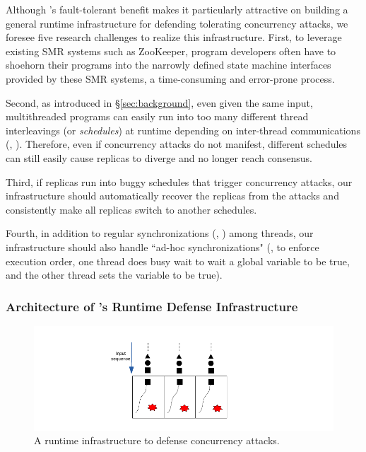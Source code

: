 Although \smr's fault-tolerant benefit makes it particularly attractive
on building a general runtime infrastructure for defending tolerating 
concurrency attacks, we foresee five research challenges to realize this 
infrastructure. First, to leverage existing SMR systems such as ZooKeeper, 
program developers often have to shoehorn their programs into the 
narrowly defined state machine interfaces provided by these SMR systems, a 
time-consuming and error-prone process.

Second, as introduced in \S\ref{sec:background}, even given the same 
input, multithreaded programs can easily run into too many different thread 
interleavings (or \emph{schedules}) at runtime depending on inter-thread 
communications (\eg, \mutexlock). Therefore, even if concurrency attacks do not 
manifest, different schedules can still easily cause replicas to diverge and no 
longer reach consensus. 


Third, if replicas run into buggy schedules that trigger concurrency attacks, 
our infrastructure should automatically recover the replicas from the 
attacks and consistently make all replicas switch to another schedules.

Fourth, in addition to regular synchronizations (\eg, \mutexlock) among 
threads, our infrastructure should also handle ``ad-hoc synchronizations" (\eg, 
to enforce execution order, one thread does busy wait to wait a global variable 
to be true, and the other thread sets the variable to be true).

\vspace{-.15in}\subsubsection{Architecture of \xxx's Runtime Defense 
Infrastructure} 
\label{sec:defense-arch}\vspace{-.075in}

\begin{figure}[ht]
\centering
\includegraphics[width=0.3\columnwidth]{figures/defense}
\vspace{-.05in}
\caption{{A runtime infrastructure to defense concurrency attacks.}} 
\label{fig:defense}
\vspace{-.05in}
\end{figure}


